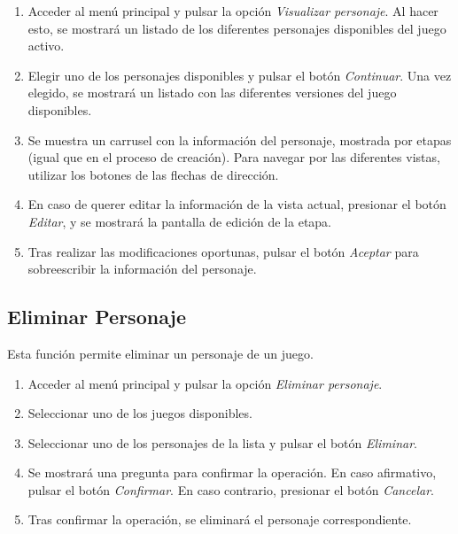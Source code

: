 \begin{enumerate}
    \item Acceder al menú principal y pulsar la opción \textit{Visualizar personaje}. Al hacer esto, 
    se mostrará un listado de los diferentes personajes disponibles del juego activo.
    \item Elegir uno de los personajes disponibles y pulsar el botón \textit{Continuar}. 
    Una vez elegido, se mostrará un listado con las diferentes versiones del juego disponibles.
    \item Se muestra un carrusel con la información del personaje, mostrada por etapas (igual que en el proceso de creación).
    Para navegar por las diferentes vistas, utilizar los botones de las flechas de dirección.
    \item En caso de querer editar la información de la vista actual, presionar el botón \textit{Editar}, y se mostrará la 
    pantalla de edición de la etapa. 
    \item Tras realizar las modificaciones oportunas, pulsar el botón \textit{Aceptar} para sobreescribir la información del 
    personaje.
\end{enumerate}

\subsection{Eliminar Personaje}
Esta función permite eliminar un personaje de un juego. \medskip

\begin{enumerate}
    \item Acceder al menú principal y pulsar la opción \textit{Eliminar personaje}.
    \item Seleccionar uno de los juegos disponibles.
    \item Seleccionar uno de los personajes de la lista y pulsar el botón \textit{Eliminar}.
    \item Se mostrará una pregunta para confirmar la operación. En caso afirmativo, pulsar el botón \textit{Confirmar}.
    En caso contrario, presionar el botón \textit{Cancelar}.
    \item Tras confirmar la operación, se eliminará el personaje correspondiente.
\end{enumerate}
